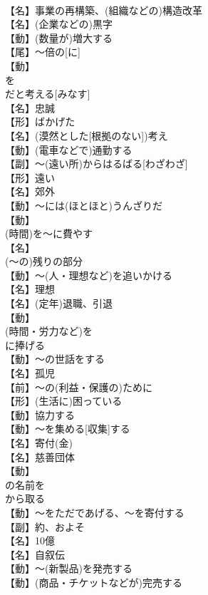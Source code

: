 \documentclass[8pt]{extreport}
\begin{document}
\begin{CJK}{UTF8}{min}
\\	【名】事業の再構築、(組織などの)構造改革
\\	【名】(企業などの)黒字
\\	【動】(数量が)増大する
\\	【尾】～倍の[に]
\\	【動】
\\	を
\\	だと考える[みなす]
\\	【名】忠誠
\\	【形】ばかげた
\\	【名】(漠然とした[根拠のない])考え
\\	【動】(電車などで)通勤する
\\	【副】～(遠い所)からはるばる[わざわざ]
\\	【形】遠い
\\	【名】郊外
\\	【動】～には(ほとほと)うんざりだ
\\	【動】
\\	(時間)を～に費やす
\\	【名】
\\	(～の)残りの部分
\\	【動】～(人・理想など)を追いかける
\\	【名】理想
\\	【名】(定年)退職、引退
\\	【動】
\\	(時間・労力など)を
\\	に捧げる
\\	【動】～の世話をする
\\	【名】孤児
\\	【前】～の(利益・保護の)ために
\\	【形】(生活に)困っている
\\	【動】協力する
\\	【動】～を集める[収集]する
\\	【名】寄付(金)
\\	【名】慈善団体
\\	【動】
\\	の名前を
\\	から取る
\\	【動】～をただであげる、～を寄付する
\\	【副】約、およそ
\\	【名】10億
\\	【名】自叙伝
\\	【動】～(新製品)を発売する
\\	【動】(商品・チケットなどが)完売する

\end{CJK}
\end{document}
